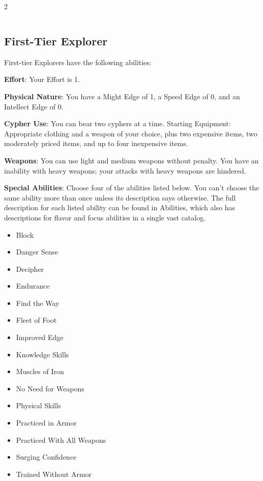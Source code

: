 \begin{multicols}{2}
\begin{table}
\begin{tabularx}{\textwidth}{| p{} | p{} |}
\end{tabularx}

\end{table}

\subsection{First-Tier Explorer}

First-tier Explorers have the following abilities:

\textbf{Effort}: Your Effort is 1.

\textbf{Physical Nature}: You have a Might Edge of 1, a Speed Edge of 0, and an Intellect Edge of 0.

\textbf{Cypher Use}: You can bear two cyphers at a time.
Starting Equipment: Appropriate clothing and a weapon of your choice, plus two expensive items, two moderately priced items, and up to four inexpensive items.

\textbf{Weapons}: You can use light and medium weapons without penalty. You have an inability with heavy weapons; your attacks with heavy weapons are hindered.

\textbf{Special Abilities}: Choose four of the abilities listed below. You can’t choose the same ability more than once unless its description says otherwise. The full description for each listed ability can be found in Abilities, which also has descriptions for flavor and focus abilities in a single vast catalog.

\begin{itemize}
\item Block
\item Danger Sense
\item Decipher
\item Endurance
\item Find the Way
\item Fleet of Foot
\item Improved Edge
\item Knowledge Skills
\item Muscles of Iron
\item No Need for Weapons
\item Physical Skills
\item Practiced in Armor
\item Practiced With All Weapons
\item Surging Confidence
\item Trained Without Armor
\end{itemize}


\end{multicols}
